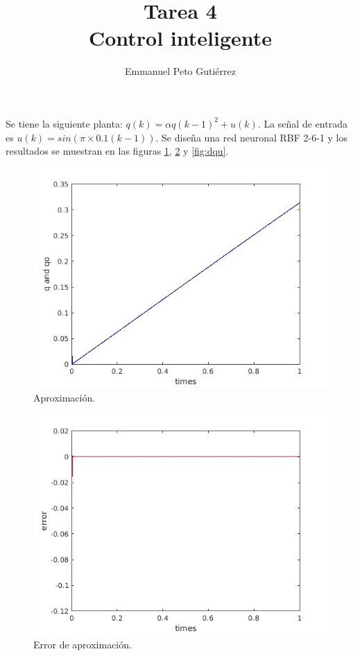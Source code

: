 \documentclass{article}
\title{Tarea 4\\Control inteligente}
\author{Emmanuel Peto Gutiérrez}
\begin{document}
\maketitle

Se tiene la siguiente planta: $q(k) = \alpha q(k-1)^2 + u(k)$. La señal de entrada es $u(k) = sin(\pi \times 0.1 (k-1))$. Se diseña una red neuronal RBF 2-6-1 y los resultados se muestran en las figuras \ref{fig:aproximacion}, \ref{fig:error} y \ref{fig:dqu}.

\begin{figure}[htbp]
\centering
\includegraphics[width=\linewidth]{q_and_qo}
\caption{Aproximación.} \label{fig:aproximacion}
\end{figure}

\begin{figure}[htbp]
\centering
\includegraphics[width=\linewidth]{error}
\caption{Error de aproximación.} \label{fig:error}
\end{figure}
\end{document}
